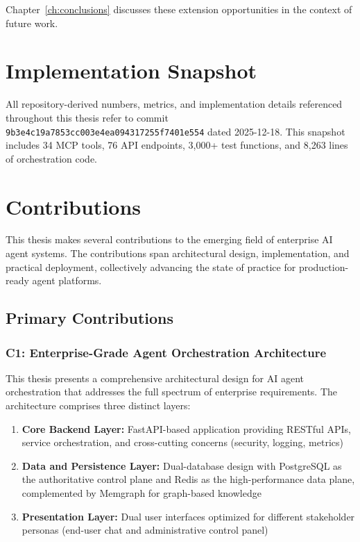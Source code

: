 \documentclass[a4paper,twoside]{sapthesis}
\newcommand{\ToolCount}{34}
\newcommand{\EndpointCount}{76}
\newcommand{\TestCount}{3,000+}
\newcommand{\OrchestratorLOC}{8,263}
\begin{document}
Chapter~\ref{ch:conclusions} discusses these extension opportunities in the context of future work.

\section{Implementation Snapshot}
\label{sec:implementation-snapshot}

All repository-derived numbers, metrics, and implementation details referenced throughout this thesis refer to commit \texttt{9b3e4c19a7853cc003e4ea094317255f7401e554} dated 2025-12-18. This snapshot includes \ToolCount{} MCP tools, \EndpointCount{} API endpoints, \TestCount{} test functions, and \OrchestratorLOC{} lines of orchestration code.

\section{Contributions}
\label{sec:contributions}

This thesis makes several contributions to the emerging field of enterprise AI agent systems. The contributions span architectural design, implementation, and practical deployment, collectively advancing the state of practice for production-ready agent platforms.

\subsection{Primary Contributions}

\subsubsection{C1: Enterprise-Grade Agent Orchestration Architecture}

This thesis presents a comprehensive architectural design for AI agent orchestration that addresses the full spectrum of enterprise requirements. The architecture comprises three distinct layers:

\begin{enumerate}
    \item \textbf{Core Backend Layer:} FastAPI-based application providing RESTful APIs, service orchestration, and cross-cutting concerns (security, logging, metrics)
    
    \item \textbf{Data and Persistence Layer:} Dual-database design with PostgreSQL as the authoritative control plane and Redis as the high-performance data plane, complemented by Memgraph for graph-based knowledge
    
    \item \textbf{Presentation Layer:} Dual user interfaces optimized for different stakeholder personas (end-user chat and administrative control panel)
\end{enumerate}
\end{document}
